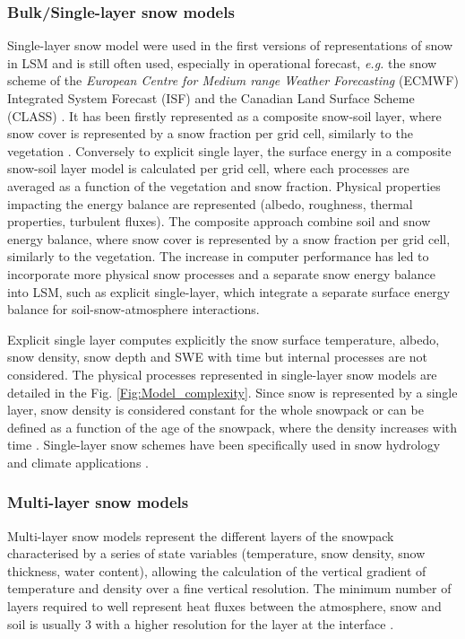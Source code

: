 \documentclass[hydrology,article,submit,moreauthors,pdftex]{Definitions/mdpi}
\begin{document}
\subsubsection{Bulk/Single-layer snow models}

Single-layer snow model were used in the first versions of representations of snow in LSM and is still often used, especially in operational forecast, \textit{e.g.} the snow scheme of the \textit{European Centre for Medium range Weather Forecasting} (ECMWF) Integrated System Forecast (ISF) \citep{Dutra_2010} and the Canadian Land Surface Scheme (CLASS) \citep{Verseghy_2009}. It has been firstly represented as a composite snow-soil layer, where snow cover is represented by a snow fraction per grid cell, similarly to the vegetation \citep{Pitman_1991,Douville_1995,Yang_1997}. Conversely to explicit single layer, the surface energy in a composite snow-soil layer model is calculated per grid cell, where each processes are averaged as a function of the vegetation and snow fraction. Physical properties impacting the energy balance are represented (albedo, roughness, thermal properties, turbulent fluxes). The composite approach combine soil and snow energy balance, where snow cover is represented by a snow fraction per grid cell, similarly to the vegetation. The increase in computer performance has led to incorporate more physical snow processes and a separate snow energy balance into LSM, such as explicit single-layer, which integrate a separate surface energy balance for soil-snow-atmosphere interactions. 

Explicit single layer computes explicitly the snow surface temperature, albedo, snow density, snow depth and SWE with time but internal processes are not considered. The physical processes represented in single-layer snow models are detailed in the Fig. \ref{Fig:Model_complexity}. Since snow is represented by a single layer, snow density is considered constant for the whole snowpack \citep{Chalita_1994,Gouttevin_2012} or can be defined as a function of the age of the snowpack, where the density increases with time \citep{Douville_1995}. Single-layer snow schemes have been specifically used in snow hydrology and climate applications \citep{Dutra_2012,Lehning_2006}. 


\subsubsection{Multi-layer snow models}\label{multilayer}


Multi-layer snow models represent the different layers of the snowpack characterised by a series of state variables (temperature, snow density, snow thickness, water content), allowing the calculation of the vertical gradient of temperature and density over a fine vertical resolution. %
The minimum number of layers required to well represent heat fluxes between the atmosphere, snow and soil is usually 3 with a higher resolution for the layer at the interface \citep{Lynch_1994,Boone_2001,Decharme_2016}. 
\end{document}

